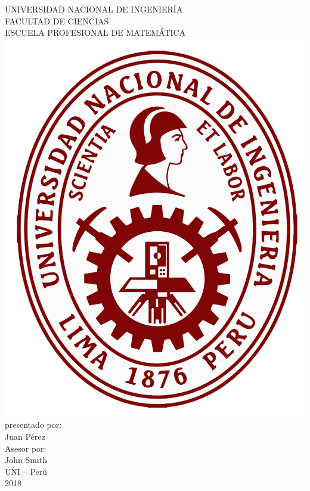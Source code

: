 \documentclass[12pt,a4paper]{report}
\numberwithin{equation}{section}
\begin{document}
\begin{titlepage}
\centering %
\bfseries %

{\Large UNIVERSIDAD NACIONAL DE INGENIERÍA\\[2mm]

FACULTAD DE CIENCIAS\\[3mm]

ESCUELA PROFESIONAL DE MATEMÁTICA}\\[5mm]

\includegraphics[scale=0.15]{logo}\\[10mm]

presentado por:\\[1cm]

{\LARGE Juan Pérez}\\[5mm]

Asesor por:\\[1cm]

{\Large John Smith}\\[1cm]

UNI -- Perú\\[5mm]

2018
\end{titlepage}
\end{document}

